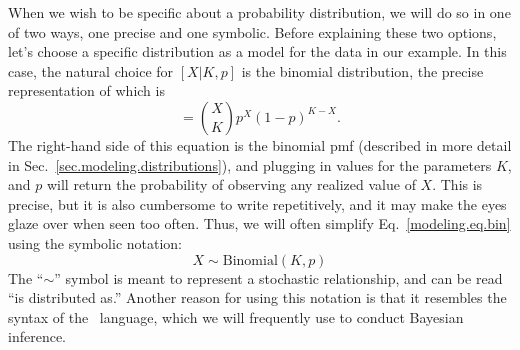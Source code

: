 When
we wish to be specific about a probability distribution, we will do
so in one of two ways, one precise and one symbolic. Before explaining
these two options, let's choose a specific distribution as a model for
the data in our example. In this case, the natural choice for
$[X|K,p]$ is the binomial distribution, the precise representation of
which is
\begin{equation}
  [X|K,p] = %
             \binom{X}{K}p^X(1-p)^{K-X}.
  \label{modeling.eq.bin}
\end{equation}
The right-hand side of this equation is the binomial pmf (described in
more detail in Sec.~\ref{sec.modeling.distributions}), and plugging in
values for the parameters $K$, and $p$ will return the probability of
observing any realized value of $X$. This is precise, but it is also
cumbersome to write repetitively, and it may make the eyes glaze over
when seen too often. Thus, we will
often simplify Eq.~\ref{modeling.eq.bin} using the symbolic notation:
\begin{equation}
  X \sim \text{Binomial}(K, p)
  \label{modeling.eq.binsym}
\end{equation}
The ``$\sim$'' symbol is meant to represent a stochastic relationship, and
can be read ``is distributed as.''
Another reason for using this notation is that
it resembles the syntax of the \bugs~language, which we will
frequently use to conduct Bayesian inference.

